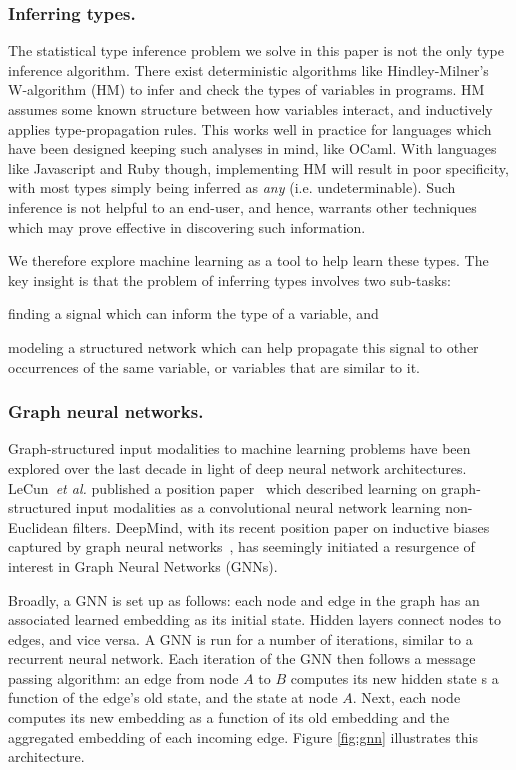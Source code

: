 \subsubsection{Inferring types.}
The statistical type inference problem we solve in this paper is not the only type inference algorithm.
There exist deterministic algorithms like Hindley-Milner's W-algorithm (HM) to infer and check the types of variables in programs.
HM assumes some known structure between how variables interact, and inductively applies type-propagation rules.
This works well in practice for languages which have been designed keeping such analyses in mind, like OCaml.
With languages like Javascript and Ruby though, implementing HM will result in poor specificity, with most types simply being inferred as \textit{any} (i.e. undeterminable).
Such inference is not helpful to an end-user, and hence, warrants other techniques which may prove effective in discovering such information.

We therefore explore machine learning as a tool to help learn these types.
The key insight is that the problem of inferring types involves two sub-tasks:
\begin{enumerate*}[label=(\roman*)]
\item finding a signal which can inform the type of a variable, and
\item modeling a structured network which can help propagate this signal to other occurrences of the same variable, or variables that are similar to it.
\end{enumerate*}

\subsubsection{Graph neural networks.}
Graph-structured input modalities to machine learning problems have been explored over the last decade in light of deep neural network architectures.
LeCun~\textit{et al.} published a position paper~\cite{henaff2015deep} which described learning on graph-structured input modalities as a convolutional neural network learning non-Euclidean filters.
DeepMind, with its recent position paper on inductive biases captured by graph neural networks~\cite{deepmind2018graph}, has seemingly initiated a resurgence of interest in Graph Neural Networks (GNNs).

Broadly, a GNN is set up as follows: each node and edge in the graph has an associated learned embedding as its initial state.
Hidden layers connect nodes to edges, and vice versa.
A GNN is run for a number of iterations, similar to a recurrent neural network.
Each iteration of the GNN then follows a message passing algorithm: an edge from node $A$ to $B$ computes its new hidden state s a function of the edge's old state, and the state at node $A$.
Next, each node computes its new embedding as a function of its old embedding and the aggregated embedding of each incoming edge.
Figure \ref{fig:gnn} illustrates this architecture.

